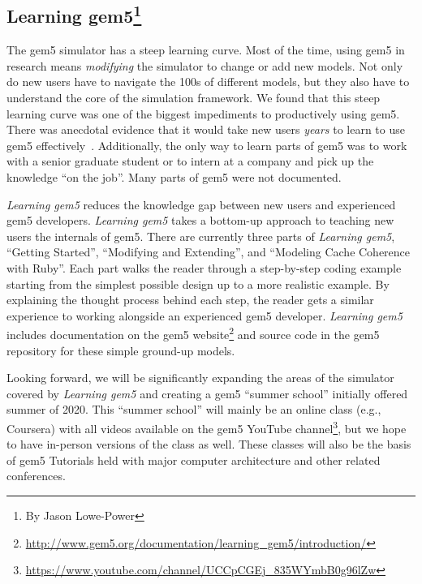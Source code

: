 \subsection[Learning gem5]{Learning gem5\footnote{By Jason Lowe-Power}}
\label{sec:learning}

The gem5 simulator has a steep learning curve.
Most of the time, using gem5 in research means \emph{modifying} the simulator to change or add new models.
Not only do new users have to navigate the 100s of different models, but they also have to understand the core of the simulation framework.
We found that this steep learning curve was one of the biggest impediments to productively using gem5.
There was anecdotal evidence that it would take new users \emph{years} to learn to use gem5 effectively~\cite{Power-gem5horrors-2015}.
Additionally, the only way to learn parts of gem5 was to work with a senior graduate student or to intern at a company and pick up the knowledge ``on the job''.
Many parts of gem5 were not documented.

\emph{Learning gem5} reduces the knowledge gap between new users and experienced gem5 developers.
\emph{Learning gem5} takes a bottom-up approach to teaching new users the internals of gem5.
There are currently three parts of \emph{Learning gem5}, ``Getting Started'', ``Modifying and Extending'', and ``Modeling Cache Coherence with Ruby''.
Each part walks the reader through a step-by-step coding example starting from the simplest possible design up to a more realistic example.
By explaining the thought process behind each step, the reader gets a similar experience to working alongside an experienced gem5 developer.
\emph{Learning gem5} includes documentation on the gem5 website\footnote{\url{http://www.gem5.org/documentation/learning_gem5/introduction/}} and source code in the gem5 repository for these simple ground-up models.

Looking forward, we will be significantly expanding the areas of the simulator covered by \emph{Learning gem5} and creating a gem5 ``summer school'' initially offered summer of 2020.
This ``summer school'' will mainly be an online class (e.g., Coursera) with all videos available on the gem5 YouTube channel\footnote{\url{https://www.youtube.com/channel/UCCpCGEj_835WYmbB0g96lZw}}, but we hope to have in-person versions of the class as well.
These classes will also be the basis of gem5 Tutorials held with major computer architecture and other related conferences.
